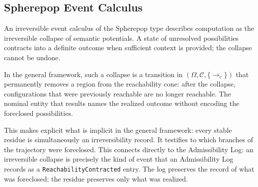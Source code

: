 \documentclass[12pt, a4paper]{article}
\theoremstyle{plain}
\theoremstyle{definition}
\theoremstyle{remark}
\begin{document}
\subsection{Spherepop Event Calculus}

An irreversible event calculus of the Spherepop type describes computation as
the irreversible collapse of semantic potentials. A state of unresolved
possibilities contracts into a definite outcome when sufficient context is
provided; the collapse cannot be undone.

In the general framework, such a collapse is a transition in
$(\Omega, \mathcal{C}, \{\to_c\})$ that permanently removes a region from
the reachability cone: after the collapse, configurations that were previously
reachable are no longer reachable. The nominal entity that results names the
realized outcome without encoding the foreclosed possibilities.

This makes explicit what is implicit in the general framework: every stable
residue is simultaneously an irreversibility record. It testifies to which
branches of the trajectory were foreclosed. This connects directly to the
Admissibility Log: an irreversible collapse is precisely the kind of event
that an Admissibility Log records as a \texttt{ReachabilityContracted}
entry. The log preserves the record of what was foreclosed; the residue
preserves only what was realized.
\end{document}
